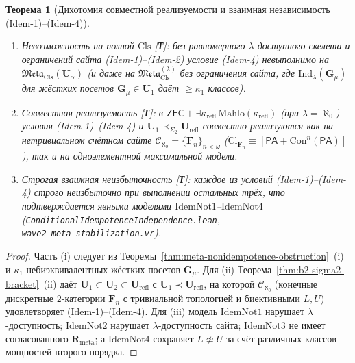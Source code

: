 \documentclass[11pt]{article}
\theoremstyle{plain}
\newtheorem{theorem}{Теорема}[section]
\theoremstyle{definition}
\newcommand{\Meta}{\mathfrak{Meta}}
\newcommand{\Cl}{\mathrm{Cl}}
\newcommand{\Con}{\mathrm{Con}}
\newcommand{\PA}{\mathsf{PA}}
\newcommand{\ZFC}{\mathsf{ZFC}}
\begin{document}
\begin{theorem}[Дихотомия совместной реализуемости и взаимная независимость \textup{(Idem-1)--(Idem-4)}]\label{thm:b2-idem-realizability}
\begin{enumerate}[nosep,label=(\roman*)]
\item \emph{Невозможность на полной $\mathrm{Cls}$ \textup{[\textbf{Т}]}}: без равномерного $\lambda$-доступного скелета и ограничений сайта \textup{(Idem-1)--(Idem-2)} условие \textup{(Idem-4)} невыполнимо на $\Meta_{\mathrm{Cls}}(\mathbf{U}_\alpha)$ (и даже на $\Meta_{\mathrm{Cls}}^{(\lambda)}$ без ограничения сайта, где $\mathrm{Ind}_\lambda(\mathbf{G}_\mu)$ для жёстких посетов $\mathbf{G}_\mu \in \mathbf{U}_1$ даёт $\ge \kappa_1$ классов).
\item \emph{Совместная реализуемость \textup{[\textbf{Т}]}}: в $\ZFC + \exists \kappa_{\mathrm{refl}}\,\mathrm{Mahlo}(\kappa_{\mathrm{refl}})$ (при $\lambda = \aleph_0$) условия \textup{(Idem-1)--(Idem-4)} и $\mathbf{U}_1 \prec_{\Sigma_2} \mathbf{U}_{\mathrm{refl}}$ совместно реализуются как на нетривиальном счётном сайте $\mathcal{C}_{\aleph_0} = \{\mathbf{F}_n\}_{n < \omega}$ ($\Cl_{\mathbf{F}_n} \equiv [\PA + \Con^n(\PA)]$), так и на одноэлементной максимальной модели.
\item \emph{Строгая взаимная неизбыточность \textup{[\textbf{Т}]}}: каждое из условий \textup{(Idem-1)--(Idem-4)} строго неизбыточно при выполнении остальных трёх, что подтверждается явными моделями $\mathrm{IdemNot1}$--$\mathrm{IdemNot4}$ (\texttt{ConditionalIdempotenceIndependence.lean}, \texttt{wave2\_meta\_stabilization.vr}).
\end{enumerate}
\end{theorem}
\begin{proof}
Часть (i) следует из Теоремы~\ref{thm:meta-nonidempotence-obstruction}~(i) и $\kappa_1$ небиэквивалентных жёстких посетов $\mathbf{G}_\mu$. Для (ii) Теорема~\ref{thm:b2-sigma2-bracket}~(ii) даёт $\mathbf{U}_1 \subset \mathbf{U}_2 \subset \mathbf{U}_{\mathrm{refl}}$ с $\mathbf{U}_1 \prec \mathbf{U}_{\mathrm{refl}}$, на которой $\mathcal{C}_{\aleph_0}$ (конечные дискретные $2$-категории $\mathbf{F}_n$ с тривиальной топологией и биективными $L, U$) удовлетворяет (Idem-1)--(Idem-4). Для (iii) модель $\mathrm{IdemNot1}$ нарушает $\lambda$-доступность; $\mathrm{IdemNot2}$ нарушает $\lambda$-доступность сайта; $\mathrm{IdemNot3}$ не имеет согласованного $\mathbf{R}_{\mathrm{meta}}$; а $\mathrm{IdemNot4}$ сохраняет $L \not\simeq U$ за счёт различных классов мощностей второго порядка.
\end{proof}
\end{document}
